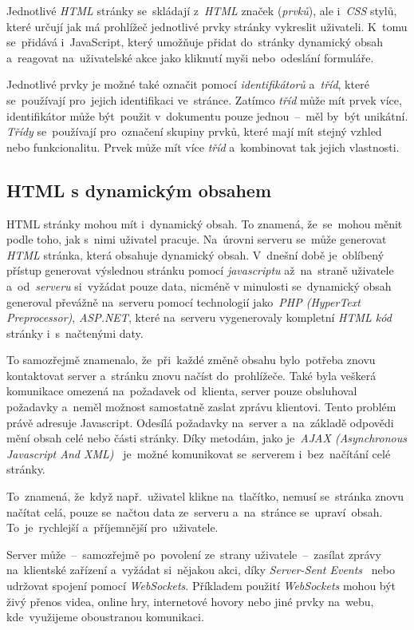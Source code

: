 \documentclass[10pt,a4paper]{article}
\begin{document}
        Jednotlivé \emph{HTML} stránky se~skládají z~\emph{HTML} značek (\emph{prvků}), ale i~\emph{CSS} stylů, které určují jak má prohlížeč jednotlivé prvky stránky vykreslit uživateli. K~tomu se~přidává i~JavaScript, který umožňuje přidat do~stránky dynamický obsah a~reagovat na~uživatelské akce jako kliknutí myši nebo~odeslání formuláře. \cite{berners:1989:proposal}

        Jednotlivé prvky je možné také označit pomocí \emph{identifikátorů} a~\emph{tříd}, které se~používají pro~jejich identifikaci ve~stránce. Zatímco \emph{tříd} může mít prvek více, identifikátor může být~použit v~dokumentu pouze jednou~--~měl by~být unikátní. \emph{Třídy} se~používají pro~označení skupiny prvků, které mají mít stejný vzhled nebo funkcionalitu. Prvek může mít více \emph{tříd} a~kombinovat tak jejich vlastnosti. \cite{jpw:tridy}

        \subsection{HTML s dynamickým obsahem}
        HTML stránky mohou mít i~dynamický obsah. To znamená, že~se~mohou měnit podle toho, jak s~nimi uživatel pracuje. Na~úrovni serveru se~může generovat \emph{HTML} stránka, která obsahuje dynamický obsah. V~dnešní době je~oblíbený přístup generovat výslednou stránku pomocí \emph{javascriptu} až~na~straně uživatele a~od~\emph{serveru} si~vyžádat pouze data, nicméně v minulosti se~dynamický obsah generoval převážně na~serveru pomocí technologií jako~\emph{PHP (HyperText Preprocessor)}, \emph{ASP.NET}, které na~serveru vygenerovaly kompletní \emph{HTML kód} stránky i~s~načtenými daty.

        To samozřejmě znamenalo, že~při~každé změně obsahu bylo~potřeba znovu kontaktovat server a~stránku znovu načíst do~prohlížeče. Také byla veškerá komunikace omezená na~požadavek od~klienta, server pouze obsluhoval požadavky a~neměl možnost samostatně zaslat zprávu klientovi. Tento problém právě adresuje Javascript. Odesílá požadavky na~server a~na~základě odpovědi mění obsah celé nebo části stránky. Díky metodám, jako je~\emph{AJAX (Asynchronous Javascript And XML)}~\cite{ajax:mdn} je~možné komunikovat se~serverem i~bez~načítání celé stránky.

        To~znamená, že~když např.~uživatel klikne na~tlačítko, nemusí se~stránka znovu načítat celá, pouze se~načtou data ze~serveru a~na~stránce se~upraví~obsah. To~je~rychlejší a~příjemnější pro~uživatele.

        Server může~--~samozřejmě po~povolení ze~strany uživatele~--~zasílat zprávy na~klientské zařízení a~vyžádat si~nějakou akci, díky \emph{Server-Sent Events}~\cite{sse:mdn} nebo udržovat spojení pomocí \emph{WebSockets}. Příkladem použití \emph{WebSockets} mohou být živý přenos videa, online hry, internetové hovory nebo jiné prvky na~webu, kde~využijeme oboustranou komunikaci.~\cite{websocket:mdn}
\end{document}
